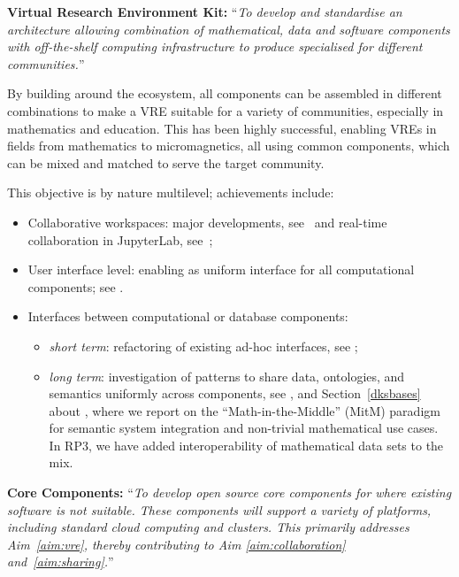 \begin{compactenum}[\bf {Obj} 1\rm]
\item\label{objective:framework} \textbf{Virtual Research Environment Kit:} ``\emph{To develop and standardise an architecture
    allowing combination of mathematical, data and software components with off-the-shelf
    computing infrastructure to produce specialised \VREs for different communities.}''

  By building around the \Jupyter ecosystem,
  all \ODK components can be assembled in different combinations
  to make a VRE suitable for a variety of communities,
  especially in mathematics and education.
  This has been highly successful,
  enabling VREs in fields from mathematics
  to micromagnetics,
  all using common \ODK components,
  which can be mixed and matched to serve
  the target community.

  This objective is by nature multilevel; achievements include:
  \begin{itemize}
  \item Collaborative workspaces: major \JupyterHub developments,
    see~
    and real-time collaboration in JupyterLab,
    see~;
  \item User interface level: enabling \Jupyter as uniform interface for all computational
    components; see .
  \item Interfaces between computational or database components:
    \begin{itemize}
    \item \emph{short term}: refactoring of existing ad-hoc interfaces, see ;
    \item \emph{long term}: investigation of patterns to share data, ontologies, and semantics uniformly across components, see , and Section~\ref{dksbases} about , where we report on the ``Math-in-the-Middle'' (MitM) paradigm for semantic system integration and non-trivial mathematical use cases. In RP3, we have added interoperability of mathematical data sets to the mix.
  \end{itemize}
\end{itemize}

\item\label{objectives:core} \textbf{Core Components:}
  ``\emph{To develop open source core components
  for \VREs where existing software is not suitable. These components
  will support a variety of platforms, including standard cloud
  computing and clusters. This primarily addresses Aim~\ref{aim:vre},
  thereby contributing to Aim \ref{aim:collaboration}
  and~\ref{aim:sharing}.}''


\end{compactenum}
